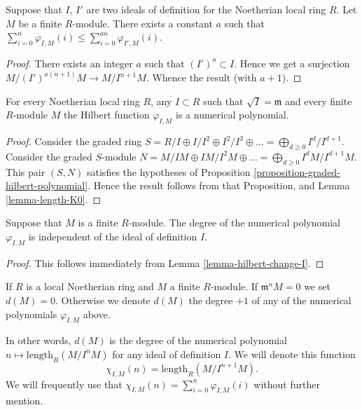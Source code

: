 \begin{lemma}
\label{lemma-hilbert-change-I}
Suppose that $I$, $I'$ are two ideals of definition
for the Noetherian local ring $R$. Let $M$ be a
finite $R$-module. There exists a constant $a$ such that
$
\sum_{i = 0}^n \varphi_{I, M}(i) \leq
\sum_{i = 0}^{an}\varphi_{I', M}(i)$.
\end{lemma}

\begin{proof}
There exists an integer $a$ such that $(I')^a \subset I$.
Hence we get a surjection $M/(I')^{a(n + 1)}M \to M/I^{n + 1}M$.
Whence the result (with $a + 1$).
\end{proof}

\begin{proposition}
\label{proposition-hilbert-function-polynomial}
For every Noetherian local ring $R$, any $I \subset R$
such that $\sqrt{I} = \mathfrak m$ and every
finite $R$-module $M$ the Hilbert function $\varphi_{I, M}$
is a numerical polynomial.
\end{proposition}

\begin{proof}
Consider the graded ring $S = R/I \oplus I/I^2 \oplus I^2/I^3 \oplus
\ldots = \bigoplus_{d \geq 0} I^d/I^{d + 1}$. Consider the graded
$S$-module $N = M/IM \oplus IM/I^2M \oplus \ldots =
\bigoplus_{d \geq 0} I^dM/I^{d + 1}M$. This pair $(S, N)$ satisfies
the hypotheses of Proposition \ref{proposition-graded-hilbert-polynomial}.
Hence the result follows from that Proposition, and
Lemma \ref{lemma-length-K0}.
\end{proof}

\begin{lemma}
\label{lemma-d-independent}
Suppose that $M$ is a finite $R$-module.
The degree of the numerical polynomial
$\varphi_{I, M}$ is independent of the
ideal of definition $I$.
\end{lemma}

\begin{proof}
This follows immediately from Lemma \ref{lemma-hilbert-change-I}.
\end{proof}

\begin{definition}
\label{definition-d}
If $R$ is a local Noetherian ring and $M$ a finite $R$-module.
If $\mathfrak m^nM = 0$ we set $d(M) = 0$.
Otherwise we denote {\it $d(M)$} the degree $+1$ of any of the numerical
polynomials
$\varphi_{I, M}$ above.
\end{definition}

\noindent
In other words, $d(M)$ is the degree of the numerical polynomial
$n \mapsto \text{length}_R(M/I^nM)$ for any ideal of definition $I$.
We will denote this function
$$
\chi_{I, M}(n) = \text{length}_R(M/I^{n + 1}M).
$$
We will frequently use that $\chi_{I, M}(n)
= \sum_{i = 0}^n \varphi_{I, M}(i)$ without further mention.

